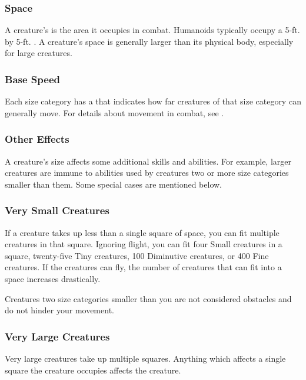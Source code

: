     \subsubsection{Space}\label{Space}
      A creature's  is the area it occupies in combat.
      Humanoids typically occupy a 5-ft. by 5-ft. .
      A creature's space is generally larger than its physical body, especially for large creatures.

    \subsubsection{Base Speed}\label{Base Speed}
      Each size category has a  that indicates how far creatures of that size category can generally move.
      For details about movement in combat, see .

    \subsubsection{Other Effects}
      A creature's size affects some additional skills and abilities.
      For example, larger creatures are immune to \atSizeBased abilities used by creatures two or more size categories smaller than them.
      Some special cases are mentioned below.

    \subsubsection{Very Small Creatures}
       If a creature takes up less than a single square of space, you can fit multiple creatures in that square.
      Ignoring flight, you can fit four Small creatures in a square, twenty-five Tiny creatures, 100 Diminutive creatures, or 400 Fine creatures.
      If the creatures can fly, the number of creatures that can fit into a space increases drastically.

       Creatures two size categories smaller than you are not considered obstacles and do not hinder your movement.

    \subsubsection{Very Large Creatures}\label{Very Large Creatures}
       Very large creatures take up multiple squares. Anything which affects a single square the creature occupies affects the creature.

